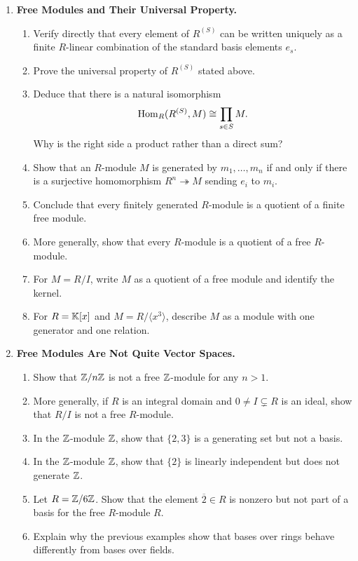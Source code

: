 \documentclass[12pt,reqno]{amsart}
\begin{document}
\begin{enumerate}[leftmargin=*, resume=problems]
\item \textbf{Free Modules and Their Universal Property.}
    \begin{enumerate}
    \item Verify directly that every element of $R^{(S)}$ can be written uniquely as a finite $R$-linear combination of the standard basis elements $e_s$.
    \item Prove the universal property of $R^{(S)}$ stated above.
    \item Deduce that there is a natural isomorphism
    \[
    \operatorname{Hom}_R(R^{(S)},M)\cong \prod_{s\in S}M.
    \]
    Why is the right side a product rather than a direct sum?
    \item Show that an $R$-module $M$ is generated by $m_1,\ldots,m_n$ if and only if there is a surjective homomorphism $R^n\twoheadrightarrow M$ sending $e_i$ to $m_i$.
    \item Conclude that every finitely generated $R$-module is a quotient of a finite free module.
    \item More generally, show that every $R$-module is a quotient of a free $R$-module.
    \item For $M=R/I$, write $M$ as a quotient of a free module and identify the kernel.
    \item For $R=\mathbb{K}[x]$ and $M=R/\langle x^3\rangle$, describe $M$ as a module with one generator and one relation.
    \end{enumerate}

\item \textbf{Free Modules Are Not Quite Vector Spaces.}
    \begin{enumerate}
    \item Show that $\mathbb{Z}/n\mathbb{Z}$ is not a free $\mathbb{Z}$-module for any $n>1$.
    \item More generally, if $R$ is an integral domain and $0\neq I\subsetneq R$ is an ideal, show that $R/I$ is not a free $R$-module.
    \item In the $\mathbb{Z}$-module $\mathbb{Z}$, show that $\{2,3\}$ is a generating set but not a basis.
    \item In the $\mathbb{Z}$-module $\mathbb{Z}$, show that $\{2\}$ is linearly independent but does not generate $\mathbb{Z}$.
    \item Let $R=\mathbb{Z}/6\mathbb{Z}$. Show that the element $\overline{2}\in R$ is nonzero but not part of a basis for the free $R$-module $R$.
    \item Explain why the previous examples show that bases over rings behave differently from bases over fields.
    \end{enumerate}


\end{enumerate}
\end{document}
